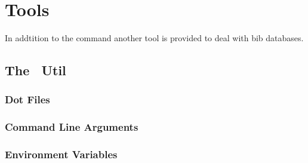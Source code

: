 
\chapter{Tools}

In addtition to the command  another tool is provided to
deal with bib databases.

\section{The \ExBib\ Util}

\INCOMPLETE

\subsection{Dot Files}


\INCOMPLETE


\subsection{Command Line Arguments}


\INCOMPLETE


\subsection{Environment Variables}


\INCOMPLETE


\endinput
%
